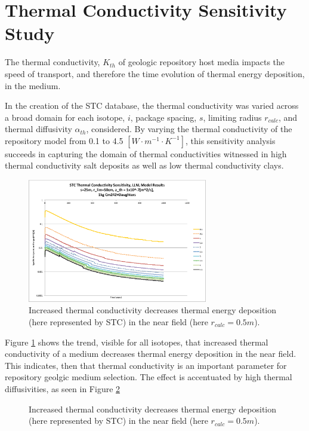 \section{Thermal Conductivity Sensitivity Study}\label{sec:conductivity}
The thermal conductivity, $K_{th}$ of geologic repository host media impacts 
the speed of transport, and therefore the time evolution of thermal energy 
deposition, in the medium. 

In the creation of the \gls{STC} database, the thermal conductivity was varied 
across a broad domain for each isotope, $i$, package spacing, $s$, limiting 
radius $r_{calc}$, and thermal diffusivity $\alpha_{th}$, considered.  By 
varying the thermal conductivity of the repository model from 0.1 to 4.5
$[W\cdot m^{-1} \cdot K^{-1}]$, this sensitivity analysis succeeds in capturing the domain of 
thermal conductivities witnessed in high thermal conductivity salt deposits as 
well as low thermal conductivity clays.

\begin{figure}[htbp!]
\begin{center}
\includegraphics[width=0.7\textwidth]{./chapters/demonstration/conductivity/Cm242kth_alpha_low.eps}
\end{center}
\caption[$K_{th}$ Sensitivity for Low $\alpha_{th}$]{Increased thermal conductivity decreases thermal energy deposition 
(here represented by \gls{STC}) in the near field (here $r_{calc} = 0.5m$).}
\label{fig:Cm242Kth_alpha_low}
\end{figure}


Figure \ref{fig:Cm242Kth_alpha_low} shows the trend, visible for all isotopes, 
that increased thermal conductivity of a medium decreases thermal energy 
deposition in the near field. This indicates, then that thermal conductivity is 
an important parameter for repository geolgic medium selection. The effect is 
accentuated by high thermal diffusivities, as seen in 
Figure \ref{fig:Cm242Kth_alpha_high}

\begin{figure}[htbp!]
\begin{center}
\end{center}
\caption[$K_{th}$ Sensitivity for High $\alpha_{th}$]{Increased thermal conductivity decreases thermal energy deposition 
(here represented by \gls{STC}) in the near field (here $r_{calc} = 0.5m$).}
\label{fig:Cm242Kth_alpha_high}
\end{figure}


